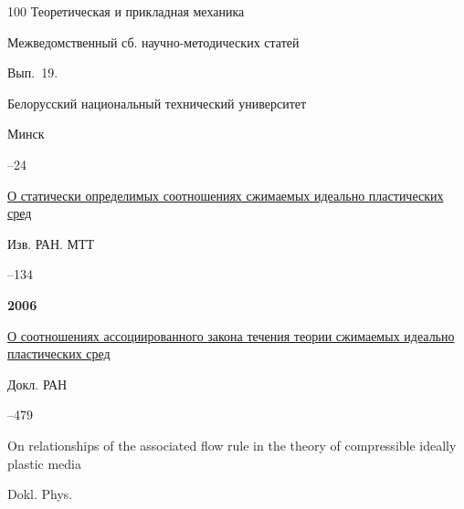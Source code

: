 \begin{thebibliography}{100}
\inbook Теоретическая и прикладная механика

\bookinfo Межведомственный сб. научно-методических статей

\issueinfo Вып.~19.

\publ  Белорусский национальный технический университет

\publaddr Минск


–24






\paper \href{http://elibrary.ru/item.asp?id=17317953}{О статически определимых соотношениях сжимаемых идеально пластических сред}

\jour Изв. РАН. МТТ



–134




\item[] \centerline{\bf 2006}




\paper \href{http://elibrary.ru/item.asp?id=9182448}{О соотношениях ассоциированного закона течения теории сжимаемых идеально пластических сред}


\jour Докл. РАН




--479



\transl

\paper On relationships of the associated flow rule in the theory of compressible ideally plastic media



\jour Dokl. Phys.




\end{thebibliography}
